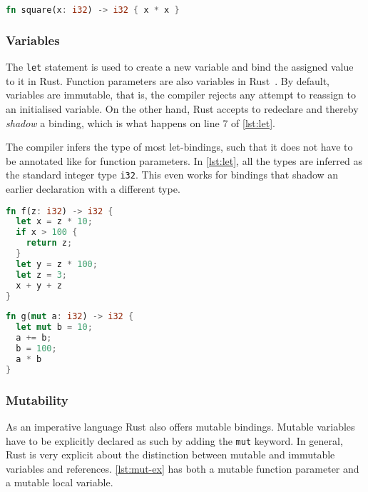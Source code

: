 \begin{lstlisting}[style=short, language=Rust, caption={A simple Rust function.}, label=lst:first-ex]
fn square(x: i32) -> i32 { x * x }
\end{lstlisting}

\subsubsection{Variables}

The \lstinline!let! statement is used to create a new variable and bind the
assigned value to it in Rust. Function parameters are also variables in
Rust~\cite{rustref}. By default, variables are immutable, that is, the compiler
rejects any attempt to reassign to an initialised variable. On the other hand,
Rust accepts to redeclare and thereby \emph{shadow} a binding, which is what
happens on line 7 of \autoref{lst:let}.

The compiler infers the type of most let-bindings, such that it  does not have
to be annotated like for function parameters. In \autoref{lst:let}, all the
types are inferred as the standard integer type \lstinline!i32!. This even works
for bindings that shadow an earlier declaration with a different type.

\noindent\begin{minipage}[t]{.45\textwidth}
\begin{lstlisting}[language=Rust, caption={A Rust function doing some arithmetics.}, label=lst:let]
fn f(z: i32) -> i32 {
  let x = z * 10;
  if x > 100 {
    return z;
  }
  let y = z * 100;
  let z = 3;
  x + y + z
}
\end{lstlisting}
\end{minipage}\hfill
\begin{minipage}[t]{.45\textwidth}
\begin{lstlisting}[language=Rust, caption={Mutable variable bindings.}, label=lst:mut-ex]
fn g(mut a: i32) -> i32 {
  let mut b = 10;
  a += b;
  b = 100;
  a * b
}
\end{lstlisting}
\end{minipage}

\subsubsection{Mutability}

As an imperative language Rust also offers mutable bindings. Mutable variables
have to be explicitly declared as such by adding the \lstinline!mut! keyword. In
general, Rust is very explicit about the distinction between mutable and
immutable variables and references. \autoref{lst:mut-ex} has both a mutable
function parameter and a mutable local variable.

